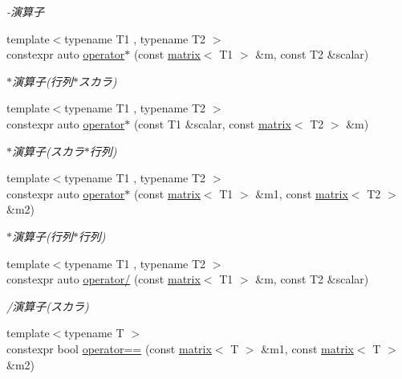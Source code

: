 \begin{DoxyCompactItemize}
\begin{DoxyCompactList}\small\item\em -\/演算子 \end{DoxyCompactList}\item 
{\footnotesize template$<$typename T1 , typename T2 $>$ }\\constexpr auto \mbox{\hyperlink{namespacesaki_a8ec94b07795582554759e6f844b6055f}{operator$\ast$}} (const \mbox{\hyperlink{classsaki_1_1matrix}{matrix}}$<$ T1 $>$ \&m, const T2 \&scalar)
\begin{DoxyCompactList}\small\item\em $\ast$演算子(行列$\ast$スカラ) \end{DoxyCompactList}\item 
{\footnotesize template$<$typename T1 , typename T2 $>$ }\\constexpr auto \mbox{\hyperlink{namespacesaki_acc7d16324180fd378c3636f9bd961d20}{operator$\ast$}} (const T1 \&scalar, const \mbox{\hyperlink{classsaki_1_1matrix}{matrix}}$<$ T2 $>$ \&m)
\begin{DoxyCompactList}\small\item\em $\ast$演算子(スカラ$\ast$行列) \end{DoxyCompactList}\item 
{\footnotesize template$<$typename T1 , typename T2 $>$ }\\constexpr auto \mbox{\hyperlink{namespacesaki_ae7d9d53f473cbaa176e97500ea9ee491}{operator$\ast$}} (const \mbox{\hyperlink{classsaki_1_1matrix}{matrix}}$<$ T1 $>$ \&m1, const \mbox{\hyperlink{classsaki_1_1matrix}{matrix}}$<$ T2 $>$ \&m2)
\begin{DoxyCompactList}\small\item\em $\ast$演算子(行列$\ast$行列) \end{DoxyCompactList}\item 
{\footnotesize template$<$typename T1 , typename T2 $>$ }\\constexpr auto \mbox{\hyperlink{namespacesaki_ac69ad44a115a64e5874921344c34d62e}{operator/}} (const \mbox{\hyperlink{classsaki_1_1matrix}{matrix}}$<$ T1 $>$ \&m, const T2 \&scalar)
\begin{DoxyCompactList}\small\item\em /演算子(スカラ) \end{DoxyCompactList}\item 
{\footnotesize template$<$typename T $>$ }\\constexpr bool \mbox{\hyperlink{namespacesaki_a67e5e15cae6e9152e0bd5ac2e1705da4}{operator==}} (const \mbox{\hyperlink{classsaki_1_1matrix}{matrix}}$<$ T $>$ \&m1, const \mbox{\hyperlink{classsaki_1_1matrix}{matrix}}$<$ T $>$ \&m2)

\end{DoxyCompactItemize}
